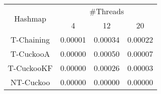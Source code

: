 \begin{tabular}{|c|c|c|c|}
\hline
\multirow{2}{*}{Hashmap} & \multicolumn{3}{c|}{\#Threads}\\\cline{2-4}& 4 & 12 & 20\\
\hline
\hline
T-Chaining & 0.00001 & 0.00034 & 0.00022\\
T-CuckooA & 0.00000 & 0.00050 & 0.00007\\
T-CuckooKF & 0.00000 & 0.00026 & 0.00003\\
NT-Cuckoo & 0.00000 & 0.00000 & 0.00000\\
\hline
\end{tabular}
